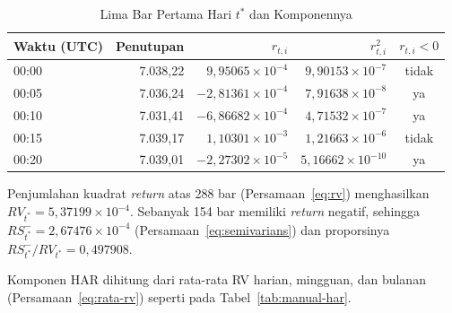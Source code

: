 \begin{table}[htbp]
  \caption{Lima Bar Pertama Hari $t^*$ dan Komponennya}
  \label{tab:manual-rv}
  \centering
  \begingroup
  \small
  \begin{tabular}{|l|r|r|r|c|}
    \hline
    \textbf{Waktu (UTC)} & \textbf{Penutupan} & \textbf{$r_{t,i}$} &
    \textbf{$r_{t,i}^2$} & \textbf{$r_{t,i} < 0$} \\
    \hline
    00:00 & 7.038,22 & $9{,}95065 \times 10^{-4}$ &
      $9{,}90153 \times 10^{-7}$ & tidak \\
    \hline
    00:05 & 7.036,24 & $-2{,}81361 \times 10^{-4}$ &
      $7{,}91638 \times 10^{-8}$ & ya \\
    \hline
    00:10 & 7.031,41 & $-6{,}86682 \times 10^{-4}$ &
      $4{,}71532 \times 10^{-7}$ & ya \\
    \hline
    00:15 & 7.039,17 & $1{,}10301 \times 10^{-3}$ &
      $1{,}21663 \times 10^{-6}$ & tidak \\
    \hline
    00:20 & 7.039,01 & $-2{,}27302 \times 10^{-5}$ &
      $5{,}16662 \times 10^{-10}$ & ya \\
    \hline
  \end{tabular}
  \endgroup
\end{table}

Penjumlahan kuadrat \textit{return} atas 288 bar (Persamaan~\eqref{eq:rv})
menghasilkan $RV_{t^*} = 5{,}37199 \times 10^{-4}$. Sebanyak 154 bar memiliki
\textit{return} negatif, sehingga $RS^-_{t^*} = 2{,}67476 \times 10^{-4}$
(Persamaan~\eqref{eq:semivarians}) dan proporsinya
$RS^-_{t^*}/RV_{t^*} = 0{,}497908$.

Komponen HAR dihitung dari rata-rata RV harian, mingguan, dan bulanan
(Persamaan~\eqref{eq:rata-rv}) seperti pada Tabel~\ref{tab:manual-har}.


